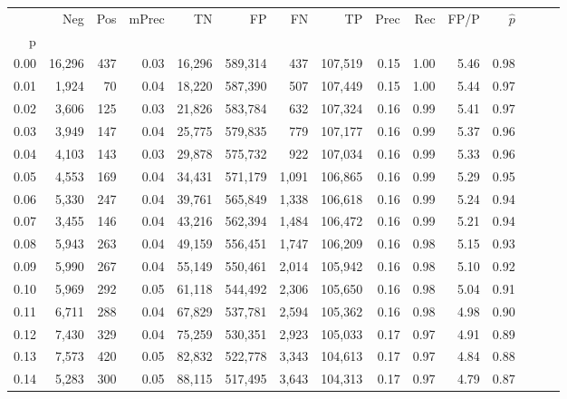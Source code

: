 \begin{tabular}{rrrrrrrrrrrrrrr}
\toprule
{} &     Neg &    Pos & mPrec &       TN &       FP &       FN &       TP &  Prec &   Rec &  FP/P & $\hat{p}$ \\
p    &         &        &       &          &          &          &          &       &       &       &           \\
\midrule
0.00 &  16,296 &    437 &  0.03 &   16,296 &  589,314 &      437 &  107,519 &  0.15 &  1.00 &  5.46 &      0.98 \\
0.01 &   1,924 &     70 &  0.04 &   18,220 &  587,390 &      507 &  107,449 &  0.15 &  1.00 &  5.44 &      0.97 \\
0.02 &   3,606 &    125 &  0.03 &   21,826 &  583,784 &      632 &  107,324 &  0.16 &  0.99 &  5.41 &      0.97 \\
0.03 &   3,949 &    147 &  0.04 &   25,775 &  579,835 &      779 &  107,177 &  0.16 &  0.99 &  5.37 &      0.96 \\
0.04 &   4,103 &    143 &  0.03 &   29,878 &  575,732 &      922 &  107,034 &  0.16 &  0.99 &  5.33 &      0.96 \\
0.05 &   4,553 &    169 &  0.04 &   34,431 &  571,179 &    1,091 &  106,865 &  0.16 &  0.99 &  5.29 &      0.95 \\
0.06 &   5,330 &    247 &  0.04 &   39,761 &  565,849 &    1,338 &  106,618 &  0.16 &  0.99 &  5.24 &      0.94 \\
0.07 &   3,455 &    146 &  0.04 &   43,216 &  562,394 &    1,484 &  106,472 &  0.16 &  0.99 &  5.21 &      0.94 \\
0.08 &   5,943 &    263 &  0.04 &   49,159 &  556,451 &    1,747 &  106,209 &  0.16 &  0.98 &  5.15 &      0.93 \\
0.09 &   5,990 &    267 &  0.04 &   55,149 &  550,461 &    2,014 &  105,942 &  0.16 &  0.98 &  5.10 &      0.92 \\
0.10 &   5,969 &    292 &  0.05 &   61,118 &  544,492 &    2,306 &  105,650 &  0.16 &  0.98 &  5.04 &      0.91 \\
0.11 &   6,711 &    288 &  0.04 &   67,829 &  537,781 &    2,594 &  105,362 &  0.16 &  0.98 &  4.98 &      0.90 \\
0.12 &   7,430 &    329 &  0.04 &   75,259 &  530,351 &    2,923 &  105,033 &  0.17 &  0.97 &  4.91 &      0.89 \\
0.13 &   7,573 &    420 &  0.05 &   82,832 &  522,778 &    3,343 &  104,613 &  0.17 &  0.97 &  4.84 &      0.88 \\
0.14 &   5,283 &    300 &  0.05 &   88,115 &  517,495 &    3,643 &  104,313 &  0.17 &  0.97 &  4.79 &      0.87 \\

\end{tabular}
